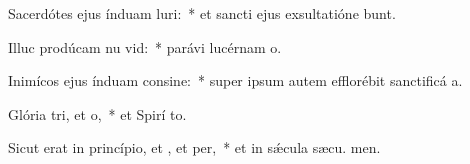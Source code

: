 \item Sacerdótes ejus índuam luri:~* et sancti ejus exsultatióne bunt.
\item Illuc prodúcam nu vid:~* parávi lucérnam  o.
\item Inimícos ejus índuam consine:~* super ipsum autem efflorébit sanctificá a.
\item Glória tri, et o,~* et Spirí to.
\item Sicut erat in princípio, et , et per,~* et in sǽcula sæcu. men.
